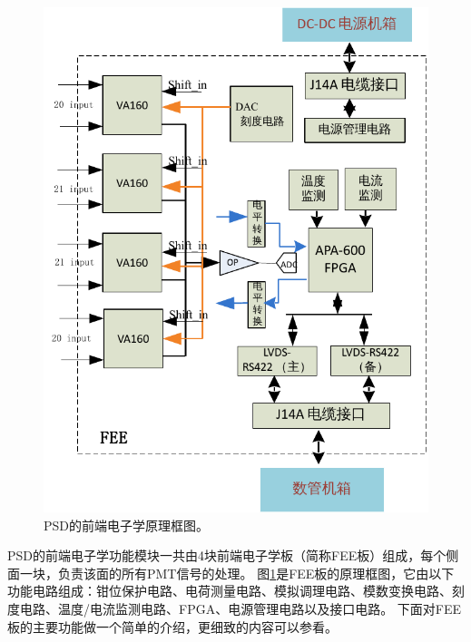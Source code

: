 \begin{figure}[htb]
	\centering
	\includegraphics[width=0.7\linewidth]{chap/description/fig/psd_fee1}
	\caption{PSD的前端电子学原理框图。}
	\label{fig:description:psd_fee1}
\end{figure}
PSD的前端电子学功能模块一共由4块前端电子学板（简称FEE板）组成，每个侧面一块，负责该面的所有PMT信号的处理。
图\ref{fig:description:psd_fee1}是FEE板的原理框图，它由以下功能电路组成：钳位保护电路、电荷测量电路、模拟调理电路、模数变换电路、刻度电路、温度/电流监测电路、FPGA、电源管理电路以及接口电路。
下面对FEE板的主要功能做一个简单的介绍，更细致的内容可以参看\parencite{yanghaibo_thesis,psd_tdr}。

